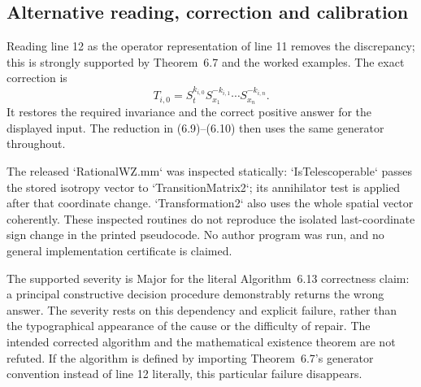 \documentclass[10pt]{article}
\begin{document}
\subsection*{Alternative reading, correction and calibration}
Reading line 12 as the operator representation of line 11 removes the discrepancy; this is strongly supported by Theorem 6.7 and the worked examples. The exact correction is \[T_{i,0}=S_t^{k_{i,0}}
           S_{x_1}^{-k_{i,1}}\cdots S_{x_n}^{-k_{i,n}}.\] It restores the required invariance and the correct positive answer for the displayed input. The reduction in (6.9)–(6.10) then uses the same generator throughout.\par
The released `RationalWZ.mm` was inspected statically: `IsTelescoperable` passes the stored isotropy vector to `TransitionMatrix2`; its annihilator test is applied after that coordinate change. `Transformation2` also uses the whole spatial vector coherently. These inspected routines do not reproduce the isolated last-coordinate sign change in the printed pseudocode. No author program was run, and no general implementation certificate is claimed.\par
The supported severity is Major for the literal Algorithm 6.13 correctness claim: a principal constructive decision procedure demonstrably returns the wrong answer. The severity rests on this dependency and explicit failure, rather than the typographical appearance of the cause or the difficulty of repair. The intended corrected algorithm and the mathematical existence theorem are not refuted. If the algorithm is defined by importing Theorem 6.7’s generator convention instead of line 12 literally, this particular failure disappears.\par
\end{document}
